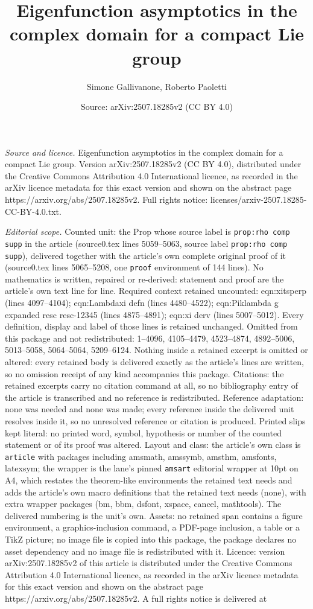 \documentclass[10pt,a4paper]{amsart}
\title[Eigenfunction asymptotics in the complex domain for a compac]{Eigenfunction asymptotics in the complex domain for a compact Lie group}
\author{Simone Gallivanone, Roberto Paoletti}
\date{Source: arXiv:2507.18285v2 (CC BY 4.0)}
\begin{document}
\maketitle

\noindent\emph{Source and licence.} Eigenfunction asymptotics in the complex domain for a compact Lie group. Version arXiv:2507.18285v2 (CC BY 4.0), distributed under the Creative Commons Attribution 4.0 International licence, as recorded in the arXiv licence metadata for this exact version and shown on the abstract page https://arxiv.org/abs/2507.18285v2. Full rights notice: licenses/arxiv-2507.18285-CC-BY-4.0.txt.\par\smallskip

\noindent\textit{Editorial scope.} Counted unit: the Prop whose source label is \texttt{prop:rho comp supp} in the article (source0.tex lines 5059--5063, source label \texttt{prop:rho comp supp}), delivered together with the article's own complete original proof of it (source0.tex lines 5065--5208, one \texttt{proof} environment of 144 lines). No mathematics is written, repaired or re-derived: statement and proof are the article's own text line for line. Required context retained uncounted: eqn:xitsperp (lines 4097--4104); eqn:Lambdaxi defn (lines 4480--4522); eqn:Piklambda g expanded resc resc-12345 (lines 4875--4891); eqn:xi derv (lines 5007--5012). Every definition, display and label of those lines is retained unchanged. Omitted from this package and not redistributed: 1--4096, 4105--4479, 4523--4874, 4892--5006, 5013--5058, 5064--5064, 5209--6124. Nothing inside a retained excerpt is omitted or altered: every retained body is delivered exactly as the article's lines are written, so no omission receipt of any kind accompanies this package. Citations: the retained excerpts carry no citation command at all, so no bibliography entry of the article is transcribed and no reference is redistributed. Reference adaptation: none was needed and none was made; every reference inside the delivered unit resolves inside it, so no unresolved reference or citation is produced. Printed slips kept literal: no printed word, symbol, hypothesis or number of the counted statement or of its proof was altered. Layout and class: the article's own class is \texttt{article} with packages including amsmath, amssymb, amsthm, amsfonts, latexsym; the wrapper is the lane's pinned \texttt{amsart} editorial wrapper at 10pt on A4, which restates the theorem-like environments the retained text needs and adds the article's own macro definitions that the retained text needs (none), with extra wrapper packages (bm, bbm, dsfont, xspace, cancel, mathtools). The delivered numbering is the unit's own. Assets: no retained span contains a figure environment, a graphics-inclusion command, a PDF-page inclusion, a table or a TikZ picture; no image file is copied into this package, the package declares no asset dependency and no image file is redistributed with it. Licence: version arXiv:2507.18285v2 of this article is distributed under the Creative Commons Attribution 4.0 International licence, as recorded in the arXiv licence metadata for this exact version and shown on the abstract page https://arxiv.org/abs/2507.18285v2. A full rights notice is delivered at 
\end{document}
